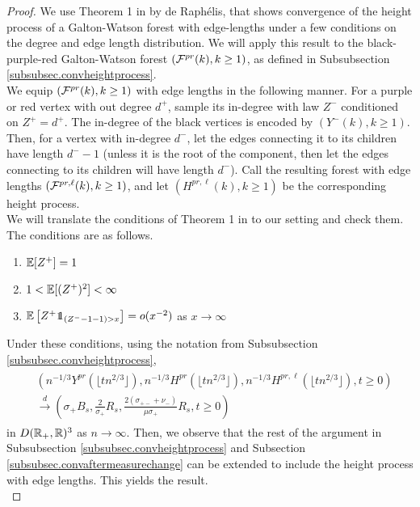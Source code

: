 \begin{proof}
We use Theorem 1 in \cite{Deraphelis2017} by de Raphélis, that shows convergence of the height process of a Galton-Watson forest with edge-lengths under a few conditions on the degree and edge length distribution. We will apply this result to the black-purple-red Galton-Watson forest $({\mathcal F}^{pr}(k),k\geq 1)$, as defined in Subsubsection \ref{subsubsec.convheightprocess}. \\
We equip $({\mathcal F}^{pr}(k),k\geq 1)$ with edge lengths in the following manner. For a purple or red vertex with out degree $d^+$, sample its in-degree with law $Z^-$ conditioned on $Z^+=d^+$. The in-degree of the black vertices is encoded by $(Y^{-}(k),k\geq 1)$.  Then, for a vertex with in-degree $d^-$, let the edges connecting it to its children have length $d^--1$ (unless it is the root of the component, then let the edges connecting to its children will have length $d^-$). Call the resulting forest with edge lengths $({\mathcal F}^{pr,\ell}(k),k\geq 1)$, and let $(H^{pr,\ell}(k),k\geq 1)$ be the corresponding height process.\\
We will translate the conditions of Theorem 1 in \cite{Deraphelis2017} to our setting and check them. The conditions are as follows.
\begin{enumerate}
    \item ${\mathbb E}[Z^+]=1$
    \item $1<{\mathbb E}[(Z^+)^2]<\infty$
    \item $\E\left[Z^+\one_{(Z^--1-1)>x}\right]=o(x^{-2})$ as $x\to \infty$
\end{enumerate}
Under these conditions, using the notation from Subsubsection \ref{subsubsec.convheightprocess},
\begin{align}\begin{split}\label{eq.convmodifiedheightprocess}
&\left(n^{-1/3}Y^{pr}\left(\lfloor t n^{2/3}\rfloor \right),n^{-1/3}H^{pr}\left(\lfloor t n^{2/3}\rfloor \right), n^{-1/3}H^{pr,\ell}\left(\lfloor t n^{2/3}\rfloor \right),t\geq 0\right)\\
&\overset{d}{\to}\left(\sigma_+ B_s, \frac{2}{\sigma_+}R_s, \frac{2(\sigma_{+-}+\nu_-)}{\mu\sigma_+}R_s,t\geq 0\right)
\end{split}\end{align}
in $D({\mathbb R}_+,{\mathbb R})^3$ as $n\to \infty$. 
Then, we observe that the rest of the argument in Subsubsection \ref{subsubsec.convheightprocess} and Subsection \ref{subsubsec.convaftermeasurechange} can be extended to include the height process with edge lengths. This yields the result.\\

\end{proof}
